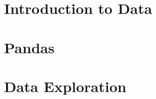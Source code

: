 \section[DataIntro]{Introduction to Data}
 
 

 \section[Pandas]{Pandas}
 

 \section[EDA]{Data Exploration}
 



% 
% 
% 


% 


% 
% 



